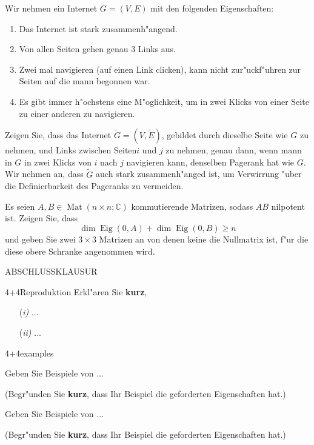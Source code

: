 \documentclass[a4paper]{article}
\begin{document}
\begin{klaufg}{8}{}
Wir nehmen ein Internet $G = (V, E)$ mit den folgenden Eigenschaften:
\begin{enumerate}
\item
Das Internet ist stark zusammenh"angend.
\item
Von allen Seiten gehen genau $3$ Links aus.
\item
Zwei mal navigieren (auf einen Link clicken), kann nicht zur"uckf"uhren zur Seiten auf die mann begonnen war.
\item
Es gibt immer h"ochstens eine M"oglichkeit, um in zwei Klicks von einer Seite zu einer anderen zu navigieren.
\end{enumerate}
Zeigen Sie, dass das Internet $\tilde{G} = (V, \tilde{E})$, gebildet durch dieselbe Seite wie $G$ zu nehmen, und Links zwischen Seiten$i$ und $j$ zu nehmen, genau dann, wenn mann in $G$ in zwei Klicks von $i$ nach $j$ navigieren kann, denselben Pagerank hat wie $G$. Wir nehmen an, dass $\tilde{G}$ auch stark zusammenh"anged ist, um Verwirrung "uber die Definierbarkeit des Pageranks zu vermeiden.
\end{klaufg}

\begin{klaufg}{8}{}
Es seien $A, B \in \operatorname{Mat}(n \times n ; \mathbb{C})$ kommutierende Matrizen, sodass $AB$ nilpotent ist. Zeigen Sie, dass
\[
\dim \operatorname{Eig}(0, A) + \dim \operatorname{Eig}(0, B) \geq n
\]
und geben Sie zwei $3 \times 3$ Matrizen an von denen keine die Nullmatrix ist, f"ur die diese obere Schranke angenommen wird.
\end{klaufg}

\pagebreak

ABSCHLUSSKLAUSUR

\begin{klaufg}{4+4}{Reproduktion}
  Erkl"aren Sie {\bfseries\sffamily kurz},

\begin{enumerate} %
\item[(\it i)] ...
   \vfill
\item[(\it ii)] ...
 \vfill
\end{enumerate}

\end{klaufg}

\pagebreak
\begin{klaufg}{4+4}{examples}


  Geben Sie Beispiele von ...

  (Begr"unden Sie {\bfseries\sffamily kurz}, dass Ihr Beispiel die
  geforderten Eigenschaften hat.)
  \pagebreak
  
    Geben Sie Beispiele von ...
  
  (Begr"unden Sie {\bfseries\sffamily kurz}, dass Ihr Beispiel die
  geforderten Eigenschaften hat.)

\end{klaufg}
\end{document}
